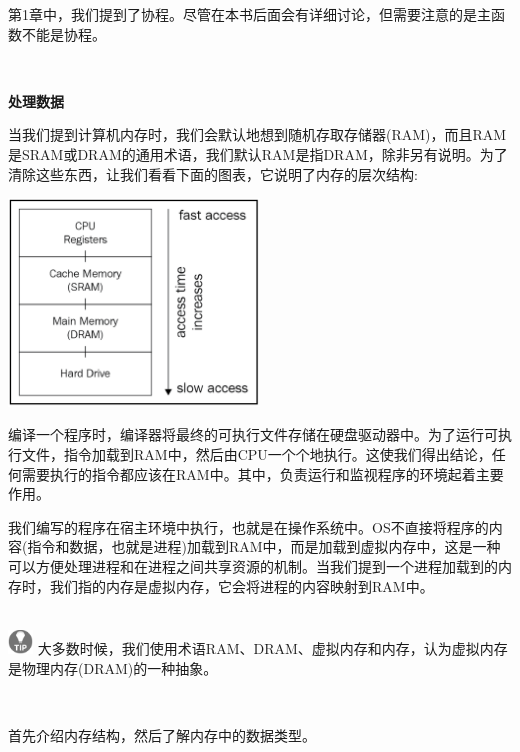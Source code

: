 第1章中，我们提到了协程。尽管在本书后面会有详细讨论，但需要注意的是主函数不能是协程。\par

\noindent\textbf{}\ \par
\textbf{处理数据} \ \par
当我们提到计算机内存时，我们会默认地想到随机存取存储器(RAM)，而且RAM是SRAM或DRAM的通用术语，我们默认RAM是指DRAM，除非另有说明。为了清除这些东西，让我们看看下面的图表，它说明了内存的层次结构: \par

\begin{center}
	\includegraphics[width=0.5\textwidth]{content/Section-1/Chapter-2/5}
\end{center}

编译一个程序时，编译器将最终的可执行文件存储在硬盘驱动器中。为了运行可执行文件，指令加载到RAM中，然后由CPU一个个地执行。这使我们得出结论，任何需要执行的指令都应该在RAM中。其中，负责运行和监视程序的环境起着主要作用。 \par
我们编写的程序在宿主环境中执行，也就是在操作系统中。OS不直接将程序的内容(指令和数据，也就是进程)加载到RAM中，而是加载到虚拟内存中，这是一种可以方便处理进程和在进程之间共享资源的机制。当我们提到一个进程加载到的内存时，我们指的内存是虚拟内存，它会将进程的内容映射到RAM中。 \par

\hspace*{\fill} \\ %
\includegraphics[width=0.05\textwidth]{images/tip}
大多数时候，我们使用术语RAM、DRAM、虚拟内存和内存，认为虚拟内存是物理内存(DRAM)的一种抽象。\par
\noindent\textbf{}\ \par

首先介绍内存结构，然后了解内存中的数据类型。 \par

